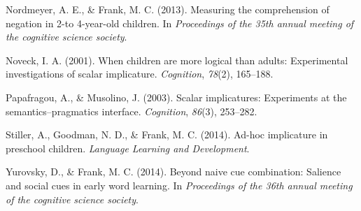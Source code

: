 \documentclass[a4paper,man,apacite,floatsintext]{apa6}
\begin{document}
Nordmeyer, A. E., \& Frank, M. C. (2013). Measuring the comprehension of
negation in 2-to 4-year-old children. In \emph{Proceedings of the 35th
annual meeting of the cognitive science society}.

Noveck, I. A. (2001). When children are more logical than adults:
Experimental investigations of scalar implicature. \emph{Cognition},
\emph{78}(2), 165--188.

Papafragou, A., \& Musolino, J. (2003). Scalar implicatures: Experiments
at the semantics--pragmatics interface. \emph{Cognition}, \emph{86}(3),
253--282.

Stiller, A., Goodman, N. D., \& Frank, M. C. (2014). Ad-hoc implicature
in preschool children. \emph{Language Learning and Development}.

Yurovsky, D., \& Frank, M. C. (2014). Beyond naive cue combination:
Salience and social cues in early word learning. In \emph{Proceedings of
the 36th annual meeting of the cognitive science society}.


\end{document}
